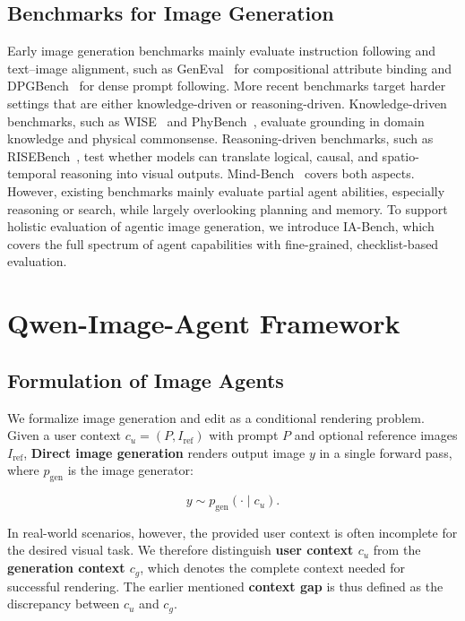 \documentclass{llmxive}
\begin{document}
\subsection{Benchmarks for Image Generation}

Early image generation benchmarks mainly evaluate instruction following and text--image alignment, such as GenEval~\citep{Ghosh2023GenEvalAO} for compositional attribute binding and DPGBench~\citep{Hu2024ELLAED} for dense prompt following. More recent benchmarks target harder settings that are either knowledge-driven or reasoning-driven. Knowledge-driven benchmarks, such as WISE~\citep{Niu2025WISEAW} and PhyBench~\citep{Meng2024PhyBenchAP}, evaluate grounding in domain knowledge and physical commonsense. Reasoning-driven benchmarks, such as RISEBench~\citep{Zhao2025EnvisioningBT}, test whether models can translate logical, causal, and spatio-temporal reasoning into visual outputs. Mind-Bench~\citep{He2026MindBrushIA} covers both aspects. However, existing benchmarks mainly evaluate partial agent abilities, especially reasoning or search, while largely overlooking planning and memory. To support holistic evaluation of agentic image generation, we introduce IA-Bench, which covers the full spectrum of agent capabilities with fine-grained, checklist-based evaluation.

\section{Qwen-Image-Agent Framework}
\subsection{Formulation of Image Agents}
We formalize image generation and edit as a conditional rendering problem. Given a user context $c_u=(P, I_{\mathrm{ref}})$ with prompt $P$ and optional reference images $I_{\mathrm{ref}}$, \textbf{Direct image generation} renders output image $y$ in a single forward pass, where $p_{\mathrm{gen}}$ is the image generator:

\begin{equation}
y \sim p_{\mathrm{gen}}(\cdot \mid c_u).
\end{equation}

In real-world scenarios, however, the provided user context is often incomplete for the desired visual task. We therefore distinguish \textbf{user context $c_u$} from the \textbf{generation context $c_g$}, which denotes the complete context needed for successful rendering. The earlier mentioned \textbf{context gap} is thus defined as the discrepancy between $c_u$ and $c_g$.
\end{document}
